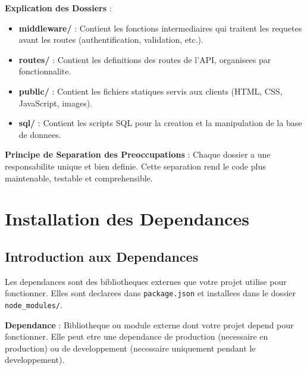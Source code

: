 \documentclass[a4paper,12pt]{book}
\begin{document}
\begin{architecturebox}
    \textbf{Explication des Dossiers} :
    \begin{itemize}
        \item \textbf{middleware/} : Contient les fonctions intermediaires qui traitent les requetes avant les routes (authentification, validation, etc.).
        \item \textbf{routes/} : Contient les definitions des routes de l'API, organisees par fonctionnalite.
        \item \textbf{public/} : Contient les fichiers statiques servis aux clients (HTML, CSS, JavaScript, images).
        \item \textbf{sql/} : Contient les scripts SQL pour la creation et la manipulation de la base de donnees.
    \end{itemize}
\end{architecturebox}

\begin{bestpracticebox}
    \textbf{Principe de Separation des Preoccupations} :
    Chaque dossier a une responsabilite unique et bien definie. Cette separation rend le code plus maintenable, testable et comprehensible.
\end{bestpracticebox}

\chapter{Installation des Dependances}

\section{Introduction aux Dependances}

Les dependances sont des bibliotheques externes que votre projet utilise pour fonctionner. Elles sont declarees dans \texttt{package.json} et installees dans le dossier \texttt{node\_modules/}.

\begin{definitionbox}
    \textbf{Dependance} : Bibliotheque ou module externe dont votre projet depend pour fonctionner. Elle peut etre une dependance de production (necessaire en production) ou de developpement (necessaire uniquement pendant le developpement).
\end{definitionbox}
\end{document}
